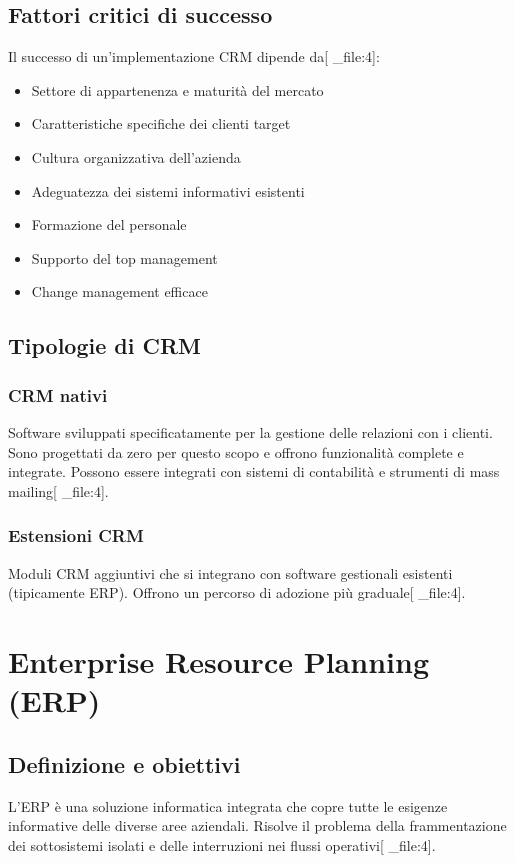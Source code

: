 \documentclass[12pt,a4paper]{article}
\begin{document}
\subsection{Fattori critici di successo}
Il successo di un'implementazione CRM dipende da[ _file:4]:
\begin{itemize}
    \item Settore di appartenenza e maturità del mercato
    \item Caratteristiche specifiche dei clienti target
    \item Cultura organizzativa dell'azienda
    \item Adeguatezza dei sistemi informativi esistenti
    \item Formazione del personale
    \item Supporto del top management
    \item Change management efficace
\end{itemize}

\subsection{Tipologie di CRM}

\subsubsection{CRM nativi}
Software sviluppati specificatamente per la gestione delle relazioni con i clienti. Sono progettati da zero per questo scopo e offrono funzionalità complete e integrate. Possono essere integrati con sistemi di contabilità e strumenti di mass mailing[ _file:4].

\subsubsection{Estensioni CRM}
Moduli CRM aggiuntivi che si integrano con software gestionali esistenti (tipicamente ERP). Offrono un percorso di adozione più graduale[ _file:4].

\section{Enterprise Resource Planning (ERP)}

\subsection{Definizione e obiettivi}
L'ERP è una soluzione informatica integrata che copre tutte le esigenze informative delle diverse aree aziendali. Risolve il problema della frammentazione dei sottosistemi isolati e delle interruzioni nei flussi operativi[ _file:4].
\end{document}
